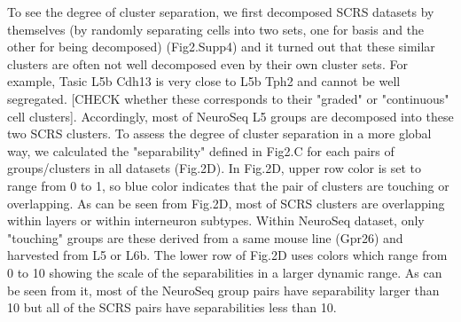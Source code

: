 To see the degree of cluster separation, we first decomposed SCRS datasets by themselves (by randomly separating cells into two sets, one for basis and the other for being decomposed) (Fig2.Supp4) and it turned out that these similar clusters are often not well decomposed even by their own cluster sets. For example, Tasic L5b Cdh13 is very close to L5b Tph2 and cannot be well segregated. [CHECK whether these corresponds to their "graded" or "continuous" cell clusters]. Accordingly, most of NeuroSeq L5 groups are decomposed into these two SCRS clusters. 
To assess the degree of cluster separation in a more global way, we calculated the "separability" defined in Fig2.C for each pairs of groups/clusters in all datasets (Fig.2D). In Fig.2D, upper row color is set to range from 0 to 1, so blue color indicates that the pair of clusters are touching or overlapping. As can be seen from Fig.2D, most of SCRS clusters are overlapping within layers or within interneuron subtypes. Within NeuroSeq dataset, only "touching" groups are these derived from a same mouse line (Gpr26) and harvested from L5 or L6b.  The lower row of Fig.2D uses colors which range from 0 to 10 showing the scale of the separabilities in a larger dynamic range. As can be seen from it, most of the NeuroSeq group pairs have separability larger than 10 but all of the SCRS pairs have separabilities less than 10.











